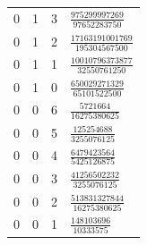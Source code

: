 \begin{longtable}{rrrl}
0 & 1 & 3 & $\frac{975299997269}{97652283750}$\\
0 & 1 & 2 & $\frac{17163191001769}{195304567500}$\\
0 & 1 & 1 & $\frac{10010796373877}{32550761250}$\\
0 & 1 & 0 & $\frac{650029271329}{65101522500}$\\
0 & 0 & 6 & $\frac{5721664}{16275380625}$\\
0 & 0 & 5 & $\frac{125254688}{3255076125}$\\
0 & 0 & 4 & $\frac{6479423564}{5425126875}$\\
0 & 0 & 3 & $\frac{41256502232}{3255076125}$\\
0 & 0 & 2 & $\frac{513831327844}{16275380625}$\\
0 & 0 & 1 & $\frac{148103696}{10333575}$\\
\bottomrule
\end{longtable}
